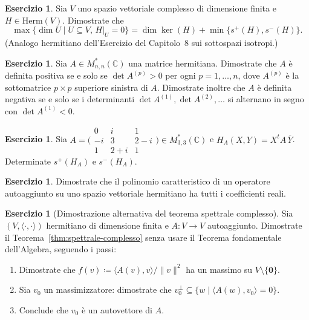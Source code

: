 \documentclass[11pt, a4paper]{book}
\theoremstyle{definition}
\newtheorem{esercizio}[definizione]{Esercizio}
\theoremstyle{plain}
\theoremstyle{remark}
\newcommand{\C}{\mathbb{C}}
\begin{document}
\begin{esercizio}
Sia $V$ uno spazio vettoriale complesso di dimensione finita e $H \in \mathrm{Herm}(V)$. Dimostrate che
\[
  \max\{ \dim U \mid U \subseteq V,\, H|_U = 0 \} = \dim\ker(H) + \min\{s^+(H),s^-(H)\}.
\]
(Analogo hermitiano dell'Esercizio del Capitolo~8 sui sottospazi isotropi.)
\end{esercizio}

\begin{esercizio}
Sia $A \in M^*_{n,n}(\C)$ una matrice hermitiana. Dimostrate che $A$ è definita positiva se e solo se $\det A^{(p)} > 0$ per ogni $p = 1,\ldots,n$, dove $A^{(p)}$ è la sottomatrice $p\times p$ superiore sinistra di $A$. Dimostrate inoltre che $A$ è definita negativa se e solo se i determinanti $\det A^{(1)}, \det A^{(2)},\ldots$ si alternano in segno con $\det A^{(1)} < 0$.
\end{esercizio}

\begin{esercizio}
Sia $A = \bigl(\begin{smallmatrix}0&i&1\\-i&3&2-i\\1&2+i&1\end{smallmatrix}\bigr) \in M^*_{3,3}(\C)$ e $H_A(X,Y) = X^t A\,\overline{Y}$. Determinate $s^+(H_A)$ e $s^-(H_A)$.
\end{esercizio}

\begin{esercizio}
Dimostrate che il polinomio caratteristico di un operatore autoaggiunto su uno spazio vettoriale hermitiano ha tutti i coefficienti reali.
\end{esercizio}

\begin{esercizio}[Dimostrazione alternativa del teorema spettrale complesso]
Sia $(V,\langle\cdot,\cdot\rangle)$ hermitiano di dimensione finita e $A \colon V \to V$ autoaggiunto. Dimostrate il Teorema~\ref{thm:spettrale-complesso} senza usare il Teorema fondamentale dell'Algebra, seguendo i passi:
\begin{enumerate}[label=(\arabic*)]
  \item Dimostrate che $f(v) \coloneqq \langle A(v),v\rangle / \|v\|^2$ ha un massimo su $V \setminus \{\mathbf{0}\}$.
  \item Sia $v_0$ un massimizzatore: dimostrate che $v_0^\perp \subseteq \{w \mid \langle A(w),v_0\rangle = 0\}$.
  \item Conclude che $v_0$ è un autovettore di $A$.
\end{enumerate}
\end{esercizio}
\end{document}
